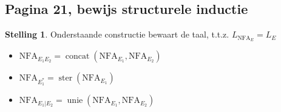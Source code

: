 \documentclass[kulak]{kulakarticle}
\newcommand{\NFA}{\text{NFA}}
\theoremstyle{definition}
\newtheorem*{stelling}{Stelling}
\begin{document}
	\subsection*{Pagina 21, bewijs structurele inductie}

	\begin{stelling}
		Onderstaande constructie bewaart de taal, t.t.z. \( L_{\NFA_E}=L_E \)
		\begin{itemize}
			\item \( \NFA_{E_1E_2}=\operatorname*{concat}(\NFA_{E_1},\NFA_{E_2}) \)
			\item \( \NFA_{E_1^*}=\operatorname*{ster}(\NFA_{E_1}) \)
			\item \( \NFA_{E_1|E_2}=\operatorname*{unie}(\NFA_{E_1},\NFA_{E_2}) \)
		\end{itemize}
	\end{stelling}
\end{document}

